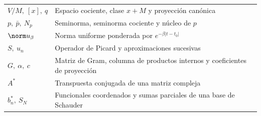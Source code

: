 \begin{longtable}{@{}p{}p{}r@{}}
$V/M,\ [x],\ q$ & Espacio cociente, clase $x+M$ y proyección canónica & \pageref{ampl:cocientes}\\
$p,\ \bar p,\ N_p$ & Seminorma, seminorma cociente y núcleo de $p$ & \pageref{ampl:nucleo-seminorma}\\
$\norm u_\beta$ & Norma uniforme ponderada por $e^{-\beta|t-t_0|}$ & \pageref{ampl:picard-equivalencia}\\
$S,\ u_n$ & Operador de Picard y aproximaciones sucesivas & \pageref{ampl:picard-teorema}\\
$G,\ \alpha,\ c$ & Matriz de Gram, columna de productos internos y coeficientes de proyección & \pageref{ampl:gram}\\
$A^*$ & Transpuesta conjugada de una matriz compleja & \pageref{ampl:gram}\\
$b_n^*,\ S_N$ & Funcionales coordenados y sumas parciales de una base de Schauder & \pageref{ampl:schauder}\\
\end{longtable}
\normalsize
